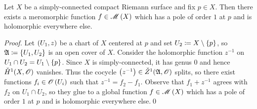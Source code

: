 \documentclass[../Moduli_Spaces_of_Riemann_Surfaces.tex]{subfiles}
\begin{document}
    \begin{corollary}\label{CC:cor:global_meromorphic_functions}
        Let $X$ be a simply-connected compact Riemann surface and fix $p\in X$. Then there exists a meromorphic function $f\in\mathscr{M}\left(X\right)$ which has a pole of order $1$ at $p$ and is holomorphic everywhere else.
    \end{corollary}
    \begin{proof}
        Let $\left(U_1,z\right)$ be a chart of $X$ centered at $p$ and set $U_2\coloneqq X\setminus\left\{p\right\}$, so $\mathfrak{A}\coloneqq\left\{U_1,U_2\right\}$ is an open cover of $X$. Consider the holomorphic function $z^{-1}$ on $U_1\cap U_2=U_1\setminus\left\{p\right\}$. Since $X$ is simply-connected, it has genus $0$ and hence $\check{H}^1\!\left(X,\mathscr{O}\right)$ vanishes. Thus the cocycle $\left(z^{-1}\right)\in\check{Z}^1\!\left(\mathfrak{A},\mathscr{O}\right)$ splits, so there exist functions $f_i\in\mathscr{O}\left(U_i\right)$ such that $z^{-1}=f_2-f_1$. Observe that $f_1+z^{-1}$ agrees with $f_2$ on $U_1\cap U_2$, so they glue to a global function $f\in\mathscr{M}\left(X\right)$ which has a pole of order $1$ at $p$ and is holomorphic everywhere else.\qed
    \end{proof}
\end{document}
